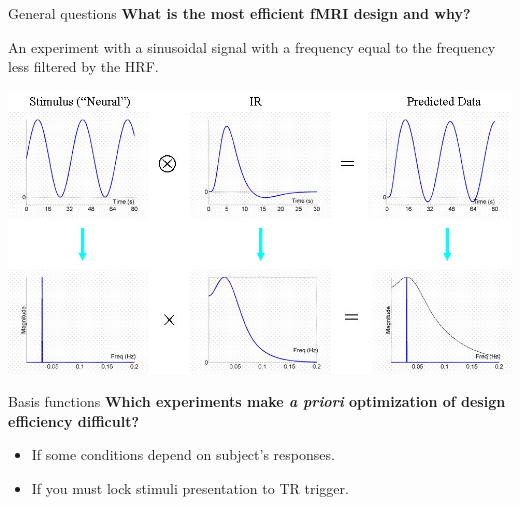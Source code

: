 \documentclass{beamer}
\begin{document}
\begin{frame}{General questions}
\textbf{What is the most efficient fMRI design and why?}

\smallskip
An experiment with a sinusoidal signal with a frequency equal to the frequency less filtered by the HRF.

  \begin{center}
    \includegraphics[scale=0.265,keepaspectratio=true]{./sinu_33s_timefreq.jpg}
  \end{center}
\end{frame}


\begin{frame}{Basis functions}
\textbf{Which experiments make \textit{a priori} optimization of design efficiency difficult?}

\smallskip
  \begin{itemize}
    \item If some conditions depend on subject's responses.
    \item If you must lock stimuli presentation to TR trigger.
  \end{itemize} 
\end{frame}
\end{document}
